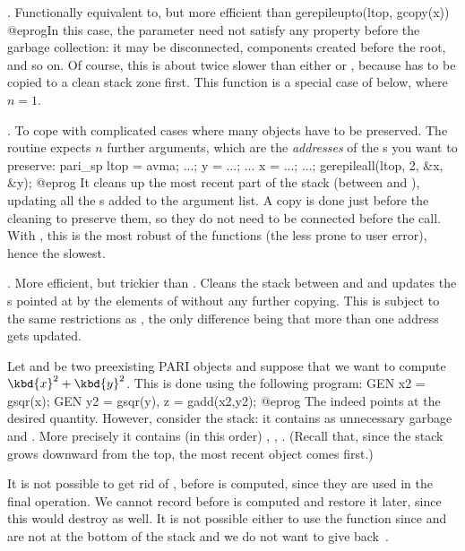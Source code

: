 . Functionally equivalent to,
but more efficient than
\bprog
  gerepileupto(ltop, gcopy(x))
@eprog\noindent In this case, the  parameter  need not
satisfy any property before the garbage collection: it may be disconnected,
components created before the root, and so on. Of course, this is about
twice slower than either  or , because
 has to be copied to a clean stack zone first. This function is a
special case of  below, where $n=1$.

.
To cope with complicated cases where many objects have to be preserved. The
routine expects $n$ further arguments, which are the \emph{addresses} of
the s you want to preserve:
\bprog
  pari_sp ltop = avma;
  ...; y = ...; ... x = ...; ...;
  gerepileall(ltop, 2, &x, &y);
@eprog\noindent
It cleans up the most recent part of the
stack (between  and ), updating all the s added
to the argument list. A copy is done just before the cleaning to preserve
them, so they do not need to be connected before the call. With
, this is the most robust of the  functions
(the less prone to user error), hence the slowest.

.
More efficient, but trickier than . Cleans the stack between
 and  and updates the s pointed at by the
elements of  without any further copying. This is subject to the
same restrictions as , the only difference being that more than
one address gets updated.



Let  and  be two preexisting PARI objects and suppose that we
want to compute $\kbd{x}^2 + \kbd{y}^2$. This is done using the following
program:
\bprog
  GEN x2 = gsqr(x);
  GEN y2 = gsqr(y), z = gadd(x2,y2);
@eprog\noindent
The   indeed points at the desired quantity. However,
consider the stack: it contains as unnecessary garbage  and .
More precisely it contains (in this order) , , .
(Recall that, since the stack grows downward from the top, the most recent
object comes first.)

It is not possible to get rid of ,  before  is
computed, since they are used in the final operation. We cannot record
 before  is computed and restore it later, since this would
destroy  as well. It is not possible either to use the function
 since  and  are not at the bottom of the stack and
we do not want to give back~.

